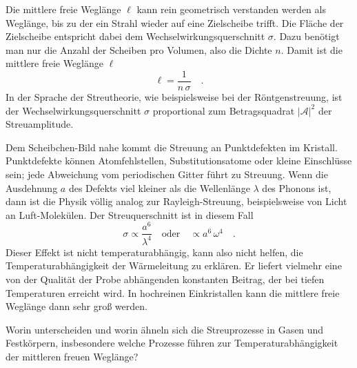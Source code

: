Die mittlere freie Weglänge $\ell$ kann rein geometrisch verstanden werden als Weglänge, bis zu der ein Strahl wieder auf eine Zielscheibe trifft. Die Fläche der Zielscheibe entspricht dabei dem Wechselwirkungsquerschnitt $\sigma$. Dazu benötigt man nur die Anzahl der Scheiben pro Volumen, also die Dichte $n$. Damit ist die mittlere freie Weglänge $\ell$
\begin{equation}
    \ell = \frac{1}{n \, \sigma} \quad .  \label{eq:1_def_weglaenge} 
\end{equation}
In der Sprache der Streutheorie, wie beispielsweise bei der Röntgenstreuung, ist der Wechselwirkungsquerschnitt $\sigma$ proportional zum Betragsquadrat $|\mathcal{A}|^2$ der Streuamplitude.

Dem Scheibchen-Bild nahe kommt die Streuung an Punktdefekten im Kristall. Punktdefekte können Atomfehlstellen, Substitutionsatome oder kleine Einschlüsse sein; jede Abweichung vom periodischen Gitter führt zu Streuung. Wenn die Ausdehnung $a$ des Defekts viel kleiner als die Wellenlänge $\lambda$ des Phonons ist, dann ist die Physik völlig analog zur Rayleigh-Streuung, beispielsweise von Licht an Luft-Molekülen. Der Streuquerschnitt ist in diesem Fall
\begin{equation}
    \sigma \propto \frac{a^6}{\lambda^4} \quad \text{oder} \quad \propto a^6 \, \omega^4 \quad .
\end{equation}
Dieser Effekt ist nicht temperaturabhängig, kann also nicht helfen, die Temperaturabhängigkeit der Wärmeleitung zu erklären. Er liefert vielmehr eine von der Qualität der Probe abhängenden konstanten Beitrag, der bei tiefen Temperaturen erreicht wird. In hochreinen Einkristallen kann die mittlere freie Weglänge dann sehr groß werden.


\begin{questions}
    \item Worin unterscheiden und worin ähneln sich die Streuprozesse in Gasen und Festkörpern, insbesondere welche Prozesse führen zur  Temperaturabhängigkeit der mittleren freuen Weglänge?
\end{questions}
    
    
    
      
